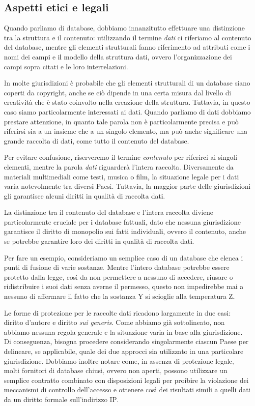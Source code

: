 \subsection{Aspetti etici e legali}
Quando parliamo di database, dobbiamo innanzitutto effettuare una distinzione tra la struttura e il contenuto: utilizzando il termine \textit{dati} ci riferiamo al contenuto del database, mentre gli elementi strutturali fanno riferimento ad attributi come i nomi dei campi e il modello della struttura dati, ovvero l'organizzazione dei campi sopra citati e le loro interrelazioni.

In molte giurisdizioni è probabile che gli elementi strutturali di un database siano coperti da copyright, anche se ciò dipende in una certa misura dal livello di creatività che è stato coinvolto nella creazione della struttura. Tuttavia, in questo caso siamo particolarmente interessati ai dati. Quando parliamo di dati dobbiamo prestare attenzione, in quanto tale parola non è particolarmente precisa e può riferirsi sia a un insieme che a un singolo elemento, ma può anche significare una grande raccolta di dati, come tutto il contenuto del database.

Per evitare confusione, riserveremo il termine \textit{contenuto} per riferirci ai singoli elementi, mentre la parola \textit{dati} riguarderà l'intera raccolta. Diversamente da materiali multimediali come testi, musica o film, la situazione legale per i dati varia notevolmente tra diversi Paesi. Tuttavia, la maggior parte delle giurisdizioni gli garantisce alcuni diritti in qualità di raccolta dati.

La distinzione tra il contenuto del database e l'intera raccolta diviene particolarmente cruciale per i database fattuali, dato che nessuna giurisdizione garantisce il diritto di monopolio sui fatti individuali, ovvero il contenuto, anche se potrebbe garantire loro dei diritti in qualità di raccolta dati.

Per fare un esempio, consideriamo un semplice caso di un database che elenca i punti di fusione di varie sostanze. Mentre l'intero database potrebbe essere protetto dalla legge, così da non permettere a nessuno di accedere, riusare o ridistribuire i suoi dati senza averne il permesso, questo non impedirebbe mai a nessuno di affermare il fatto che la sostanza Y si scioglie alla temperatura Z.

Le forme di protezione per le raccolte dati ricadono largamente in due casi: diritto d'autore e diritto \textit{sui generis}. Come abbiamo già sottolineato, non abbiamo nessuna regola generale e la situazione varia in base alla giurisdizione. Di conseguenza, bisogna procedere considerando singolarmente ciascun Paese per delineare, se applicabile, quale dei due approcci sia utilizzato in una particolare giurisdizione. Dobbiamo inoltre notare come, in assenza di protezione legale, molti fornitori di database chiusi, ovvero non aperti, possono utilizzare un semplice contratto combinato con disposizioni legali per proibire la violazione dei meccanismi di controllo dell'accesso e ottenere così dei risultati simili a quelli dati da un diritto formale sull'indirizzo IP.

